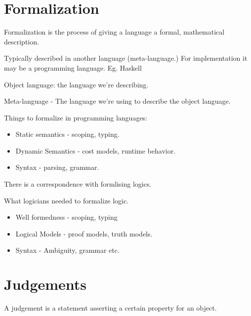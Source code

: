 
\section{Formalization}

\begin{definition}
  Formalization is the process of giving a language a formal, mathematical description.

  Typically described in another language (meta-language.) For implementation it may be a programming language.
  Eg. Haskell
\end{definition}


\begin{definition}
  Object language: the language we're describing.
\end{definition}

\begin{definition}
  Meta-language - The language we're using to describe the object language.
\end{definition}

Things to formalize in programming languages:
\begin{itemize}
  \item Static semantics - scoping, typing.
  \item Dynamic Semantics - cost models, runtime behavior.
  \item Syntax - parsing, grammar.
\end{itemize}

There is a correspondence with formlising logics.

What logicians needed to formalize logic.

\begin{itemize}
  \item Well formedness - scoping, typing 
  \item Logical Models - proof models, truth models.
  \item Syntax - Ambiguity, grammar etc.
\end{itemize}

\section{Judgements}

\begin{definition}
  A judgement is a statement asserting a certain property for an object.
\end{definition}

